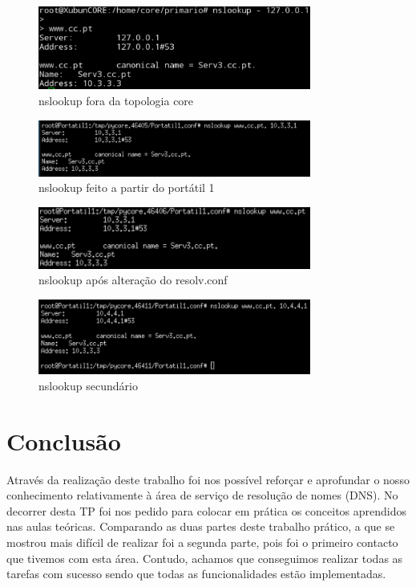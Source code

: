 \documentclass[a4paper]{report}
\begin{document}
\begin{figure}[H]
    \centering 
    \includegraphics[width=0.8\textwidth]{images/ns_outcore.png}  
    \caption{nslookup fora da topologia core}
    \label{fig:ns_outcore}
\end{figure}

\begin{figure}[H]
    \centering 
    \includegraphics[width=0.8\textwidth]{images/nslookup_portatil1.png}  
    \caption{nslookup feito a partir do portátil 1}
    \label{fig:nslookup_portatil1}
\end{figure}

\begin{figure}[H]
    \centering 
    \includegraphics[width=0.8\textwidth]{images/nslookup_resolv.png}  
    \caption{nslookup após alteração do resolv.conf}
    \label{fig:nslookup_resolv}
\end{figure}

\begin{figure}[H]
    \centering 
    \includegraphics[width=0.8\textwidth]{images/nslookup_secondario.png}  
    \caption{nslookup secundário}
    \label{fig:nslookup_resolv}
\end{figure}

\chapter{Conclusão}

Através da realização deste trabalho foi nos possível reforçar e aprofundar
o nosso conhecimento relativamente à área de serviço de resolução de nomes 
(DNS). No decorrer desta TP foi nos pedido para colocar em prática os 
conceitos aprendidos nas aulas teóricas.
Comparando as duas partes deste trabalho prático, a que se mostrou mais 
difícil de realizar foi a segunda parte, pois foi o primeiro contacto que
tivemos com esta área. Contudo, achamos que conseguimos realizar todas as
tarefas com sucesso sendo que todas as funcionalidades estão implementadas.
\end{document}
